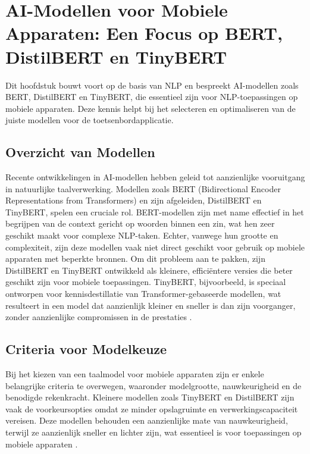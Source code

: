 \section{AI-Modellen voor Mobiele Apparaten: Een Focus op BERT, DistilBERT en TinyBERT}

Dit hoofdstuk bouwt voort op de basis van NLP en bespreekt AI-modellen zoals BERT, DistilBERT en TinyBERT, die essentieel zijn voor NLP-toepassingen op mobiele apparaten. Deze kennis helpt bij het selecteren en optimaliseren van de juiste modellen voor de toetsenbordapplicatie.

\subsection{Overzicht van Modellen}

Recente ontwikkelingen in AI-modellen hebben geleid tot aanzienlijke vooruitgang in natuurlijke taalverwerking. Modellen zoals BERT (Bidirectional Encoder Representations from Transformers) en zijn afgeleiden, DistilBERT en TinyBERT, spelen een cruciale rol. BERT-modellen zijn met name effectief in het begrijpen van de context gericht op woorden binnen een zin, wat hen zeer geschikt maakt voor complexe NLP-taken. Echter, vanwege hun grootte en complexiteit, zijn deze modellen vaak niet direct geschikt voor gebruik op mobiele apparaten met beperkte bronnen. Om dit probleem aan te pakken, zijn DistilBERT en TinyBERT ontwikkeld als kleinere, efficiëntere versies die beter geschikt zijn voor mobiele toepassingen. TinyBERT, bijvoorbeeld, is speciaal ontworpen voor kennisdestillatie van Transformer-gebaseerde modellen, wat resulteert in een model dat aanzienlijk kleiner en sneller is dan zijn voorganger, zonder aanzienlijke compromissen in de prestaties \autocite{Jiao2019TinyBERT}.

\subsection{Criteria voor Modelkeuze}

Bij het kiezen van een taalmodel voor mobiele apparaten zijn er enkele belangrijke criteria te overwegen, waaronder modelgrootte, nauwkeurigheid en de benodigde rekenkracht. Kleinere modellen zoals TinyBERT en DistilBERT zijn vaak de voorkeursopties omdat ze minder opslagruimte en verwerkingscapaciteit vereisen. Deze modellen behouden een aanzienlijke mate van nauwkeurigheid, terwijl ze aanzienlijk sneller en lichter zijn, wat essentieel is voor toepassingen op mobiele apparaten \autocite{Sun2020MobileBERT}.

